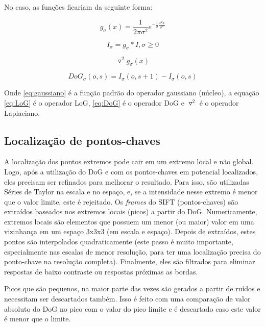 No caso, as funções ficariam da seguinte forma: 

\begin{equation}
\label{eq:gaussiano}
	g_\sigma(x) = \frac{1}{2 \pi \sigma ^2} e^{-\frac{1}{2} \frac{x^T x}{\sigma ^2}}
\end{equation}

\begin{equation}
\label{eq:gaussianScaleSpace}
	I_\sigma = g_\sigma * I, \sigma \geq 0
\end{equation}

\begin{equation}
\label{eq:LoG}
	\triangledown^2	g_\sigma(x)
\end{equation}

\begin{equation}
\label{eq:DoG}
	DoG_\sigma(o,s) = I_\sigma(o,s+1) - I_\sigma(o,s)
\end{equation}


Onde \ref{eq:gaussiano} é a função padrão do operador gaussiano (núcleo), a equação \ref{eq:LoG} é o operador LoG,  \ref{eq:DoG} é o operador DoG e $\triangledown^2$ é o operador Laplaciano.

\subsection*{Localização de pontos-chaves}

A localização dos pontos extremos pode cair em um extremo local e não global. Logo, após a utilização do DoG e com os pontos-chaves em potencial localizados, eles precisam ser refinados para melhorar o resultado. Para isso, são utilizadas Séries de Taylor na escala e no espaço, e, se a intensidade nesse extremo é menor que o valor limite, este é rejeitado.
Os \emph{frames} do SIFT (pontos-chaves) são extraídos baseados nos extremos locais (picos) a partir do DoG. Numericamente, extremos locais são elementos que possuem um menor (ou maior) valor em uma vizinhança em um espaço 3x3x3 (em escala e espaço).
Depois de extraídos, estes pontos são interpolados quadraticamente (este passo é muito importante, especialmente nas escalas de menor resolução, para ter uma localização precisa do ponto-chave na resolução completa). Finalmente, eles são filtrados para eliminar respostas de baixo contraste ou respostas próximas as bordas.


Picos que são pequenos, na maior parte das vezes são gerados a partir de ruídos e necessitam ser descartados também. Isso é feito com uma comparação de valor absoluto do DoG no pico com o valor do pico limite e é descartado caso este valor é menor que o limite.


